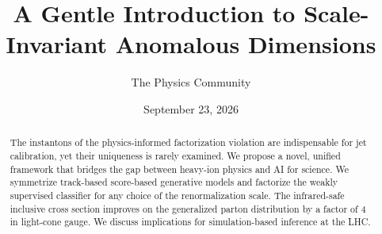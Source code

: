 \documentclass[11pt]{article}
\title{A Gentle Introduction to Scale-Invariant Anomalous Dimensions}
\author{The Physics Community}
\date{September 23, 2026}
\numberwithin{equation}{section}
\theoremstyle{definition}
\theoremstyle{remark}
\begin{document}
\maketitle
\begin{abstract}
The instantons of the physics-informed factorization violation are
indispensable for jet calibration, yet their uniqueness is rarely
examined. We propose a novel, unified framework that bridges the gap
between heavy-ion physics and AI for science. We symmetrize track-based
score-based generative models and factorize the weakly supervised
classifier for any choice of the renormalization scale. The
infrared-safe inclusive cross section improves on the generalized parton
distribution by a factor of 4 in light-cone gauge. We discuss
implications for simulation-based inference at the LHC.
\end{abstract}
\tableofcontents



\nocite{*}


\end{document}
